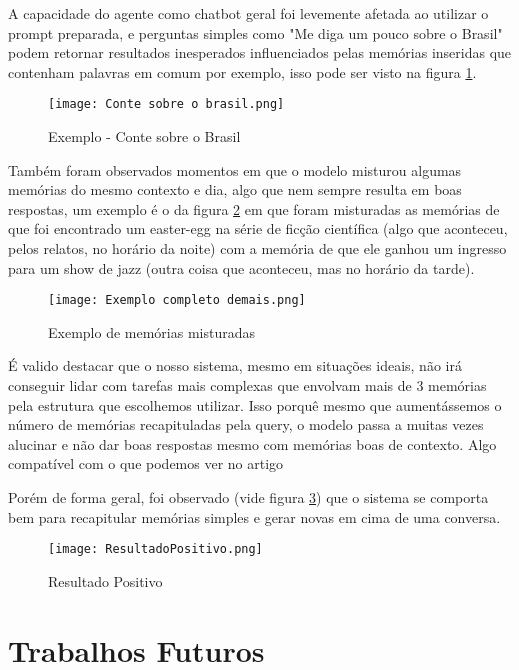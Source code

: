 \documentclass[conference]{IEEEtran}
\begin{document}
A capacidade do agente como chatbot geral foi levemente afetada ao utilizar o prompt preparada, e perguntas simples como "Me diga um pouco sobre o Brasil" podem retornar resultados inesperados influenciados pelas memórias inseridas que contenham palavras em comum por exemplo, isso pode ser visto na figura \ref{fig:Brasill}. 
\begin{figure}[h]
    \centering
    \texttt{[image: Conte sobre o brasil.png]}
    \caption{Exemplo - Conte sobre o Brasil}
    \label{fig:Brasill}
\end{figure}

Também foram observados momentos em que o modelo misturou algumas memórias do mesmo contexto e dia, algo que nem sempre resulta em boas respostas, um exemplo é o da figura \ref{fig:MisturaMem} em que foram misturadas as memórias de que foi encontrado um easter-egg na série de ficção científica (algo que aconteceu, pelos relatos, no horário da noite) com a memória de que ele ganhou um ingresso para um show de jazz (outra coisa que aconteceu, mas no horário da tarde).
\begin{figure}[h]
    \centering
    \texttt{[image: Exemplo completo demais.png]}
    \caption{Exemplo de memórias misturadas}
    \label{fig:MisturaMem}
\end{figure}


É valido destacar que o nosso sistema, mesmo em situações ideais, não irá conseguir lidar com tarefas mais complexas que envolvam mais de 3 memórias pela estrutura que escolhemos utilizar. Isso porquê mesmo que aumentássemos o número de memórias recapituladas pela query, o modelo passa a muitas vezes alucinar e não dar boas respostas mesmo com memórias boas de contexto. Algo compatível com o que podemos ver no artigo \cite{b1}

Porém de forma geral, foi observado (vide figura \ref{fig:ResulPos}) que o sistema se comporta bem para recapitular memórias simples e gerar novas em cima de uma conversa.
\begin{figure}[h]
    \centering
    \texttt{[image: ResultadoPositivo.png]}
    \caption{Resultado Positivo}
    \label{fig:ResulPos}
\end{figure}




\section*{Trabalhos Futuros}
\end{document}
